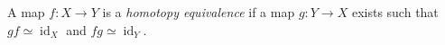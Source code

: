 
A map $f:X\to Y$ is a \emph{homotopy equivalence} if a map $g:Y\to X$ exists such that $gf\simeq\operatorname{id}_X$ and $fg\simeq\operatorname{id}_Y$.
